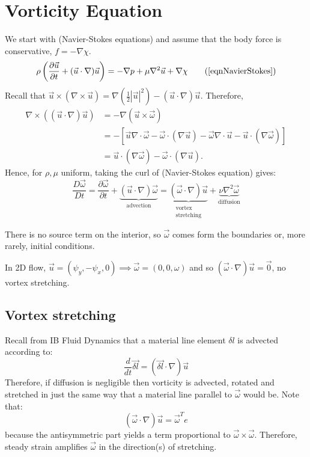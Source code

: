 \documentclass[../Main.tex]{subfiles}
\begin{document}
\section{Vorticity Equation}
We start with  (Navier-Stokes equations) and assume that the body force is conservative, $f = -\nabla \chi$.
\begin{equation*}
    \rho \left(\frac{\partial \vec u}{\partial t} + (\vec{u} \cdot \nabla)\vec u\right) = -\nabla p + \mu \nabla^2 \vec u + \nabla \chi
    \tag{\ref{eqnNavierStokes}}
\end{equation*}
Recall that $\vec u \times (\nabla \times \vec{u}) = \nabla \left(\frac12 |\vec{u}|^2\right) - (\vec{u} \cdot \nabla) \vec{u}$. Therefore,
\begin{align*}
    \nabla \times ((\vec{u} \cdot \nabla)\vec u) &= -\nabla (\vec{u} \times \vec{\omega}) \\
    &= -\left[\vec u \nabla \cdot \vec{\omega} - \vec\omega \cdot (\nabla \vec u) - \vec\omega \nabla \cdot \vec{u} - \vec u \cdot (\nabla \vec\omega)\right] \\
    &= \vec u \cdot (\nabla \vec\omega) - \vec\omega \cdot (\nabla \vec u).
\end{align*}
Hence, for $\rho, \mu$ uniform, taking the curl of  (Navier-Stokes equation) gives:
\begin{equation}
    \frac{D \vec\omega}{D t} = \frac{\partial \vec\omega}{\partial t} + \underbrace{(\vec u \cdot \nabla) \vec\omega}_{\text{advection}} = \underbrace{(\vec{\omega} \cdot \nabla)\vec u}_{\substack{\text{vortex}\\\text{stretching}}} + \underbrace{\nu \nabla^2 \vec\omega}_{\text{diffusion}}
    \label{eqnVorticity}
\end{equation}
\begin{remarks}
    \item There is no source term on the interior, so $\vec\omega$ comes form the boundaries or, more rarely, initial conditions.
    \item In 2D flow, $\vec u = (\psi_y, -\psi_x, 0) \implies \vec\omega = (0, 0, \omega)$ and so $(\vec{\omega} \cdot \nabla)\vec u = \vec 0$, no vortex stretching.
\end{remarks}
\subsection{Vortex stretching}
Recall from IB Fluid Dynamics that a material line element $\delta l$ is advected according to:
\begin{equation*}
    \frac{d}{dt} \vec{\delta l} = (\vec{\delta l} \cdot \nabla) \vec u
\end{equation*}
Therefore, if diffusion is negligible then vorticity is advected, rotated and stretched in just the same way that a material line parallel to $\vec\omega$ would be. Note that:
\begin{equation*}
    (\vec{\omega} \cdot \nabla)\vec u = \vec\omega^T e
\end{equation*}
because the antisymmetric part yields a term proportional to $\vec{\omega} \times \vec{\omega}$. Therefore, steady strain amplifies $\vec\omega$ in the direction(s) of stretching.
\end{document}
